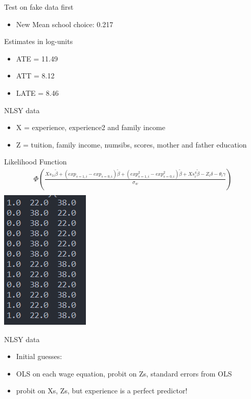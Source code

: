 \documentclass{beamer}
\begin{document}
\begin{frame}{Test on fake data first}
\begin{itemize}
\item New Mean school choice: 0.217
\end{itemize}
\end{frame}

\begin{frame}{Estimates in log-units}
\begin{itemize}
\item ATE = 11.49
\item ATT = 8.12
\item LATE = 8.46
\end{itemize}
\end{frame}


\begin{frame}{NLSY data}
\begin{itemize}
\item X = experience, experience2 and family income
\item Z = tuition, family income, numsibs, scores, mother and father education
\end{itemize}
\end{frame}

\begin{frame}{Likelihood Function}
\begin{align}
\Phi(\frac{Xs_{1i}\tilde{\beta} + (exp_{s=1,i} - exp_{s=0,i})\tilde{\beta} + (exp^2_{s=1,i} - exp^2_{s=0,i})\tilde{\beta} + Xs^4_{i}\tilde{\beta} - Z_i \delta - \theta_i \gamma}{\sigma_w}) \\
\end{align}
\centering
\includegraphics[scale=0.59]{xsb_example.png}
\end{frame}

\begin{frame}{NLSY data}
\begin{itemize}
\item Initial guesses:
\item OLS on each wage equation, probit on Zs, standard errors from OLS
\item probit on Xs, Zs, but experience is a perfect predictor!
\end{itemize}
\end{frame}
\end{document}
